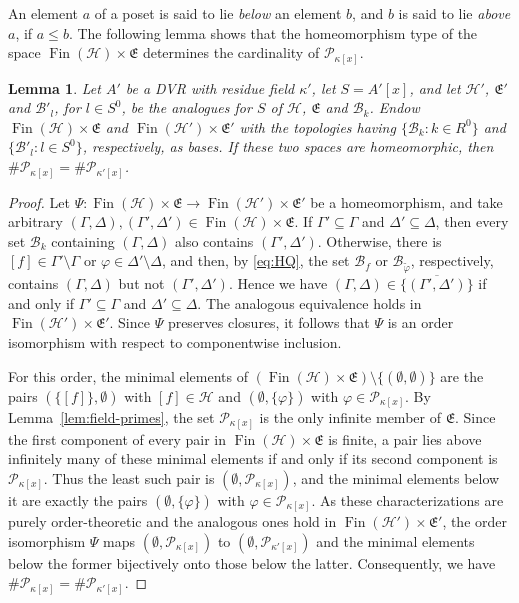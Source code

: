 \documentclass[12pt,reqno,a4paper]{amsart}
\newcommand{\Pe}{\mathcal{P}}
\DeclareMathOperator{\Fin}{Fin}
\theoremstyle{plain}
\newtheorem{lemma}[theorem]{Lemma}
\theoremstyle{definition}
\begin{document}
An element $a$ of a poset is said to lie \emph{below} an element $b$, and $b$ is said to lie \emph{above} $a$, if $a\leq b$. The following lemma shows that the homeomorphism type of the space $\Fin(\mathcal{H})\times\mathfrak{E}$ determines the cardinality of $\Pe_{\kappa[x]}$.
\begin{lemma}\label{lem:order-AX}
Let $A'$ be a DVR with residue field $\kappa'$, let $S=A'[x]$, and let $\mathcal{H}'$, $\mathfrak{E}'$ and $\mathcal{B}'_l$, for $l\in S^0$, be the analogues for $S$ of $\mathcal{H}$, $\mathfrak{E}$ and $\mathcal{B}_k$. Endow $\Fin(\mathcal{H})\times\mathfrak{E}$ and $\Fin(\mathcal{H}')\times\mathfrak{E}'$ with the topologies having $\{\mathcal{B}_k:k\in R^0\}$ and $\{\mathcal{B}'_l:l\in S^0\}$, respectively, as bases. If these two spaces are homeomorphic, then $\#\Pe_{\kappa[x]}=\#\Pe_{\kappa'[x]}$.
\end{lemma}
\begin{proof}
Let $\Psi\colon\Fin(\mathcal{H})\times\mathfrak{E}\to\Fin(\mathcal{H}')\times\mathfrak{E}'$ be a homeomorphism, and take arbitrary $(\Gamma,\Delta),(\Gamma',\Delta')\in\Fin(\mathcal{H})\times\mathfrak{E}$. If $\Gamma'\subseteq\Gamma$ and $\Delta'\subseteq\Delta$, then every set $\mathcal{B}_k$ containing $(\Gamma,\Delta)$ also contains $(\Gamma',\Delta')$. Otherwise, there is $[f]\in\Gamma'\setminus\Gamma$ or $\varphi\in\Delta'\setminus\Delta$, and then, by \eqref{eq:HQ}, the set $\mathcal{B}_f$ or $\mathcal{B}_{\tilde\varphi}$, respectively, contains $(\Gamma,\Delta)$ but not $(\Gamma',\Delta')$. Hence we have $(\Gamma,\Delta)\in\overline{\{(\Gamma',\Delta')\}}$ if and only if $\Gamma'\subseteq\Gamma$ and $\Delta'\subseteq\Delta$. The analogous equivalence holds in $\Fin(\mathcal{H}')\times\mathfrak{E}'$. Since $\Psi$ preserves closures, it follows that $\Psi$ is an order isomorphism with respect to componentwise inclusion.

For this order, the minimal elements of $(\Fin(\mathcal{H})\times\mathfrak{E})\setminus\{(\emptyset,\emptyset)\}$ are the pairs $(\{[f]\},\emptyset)$ with $[f]\in\mathcal{H}$ and $(\emptyset,\{\varphi\})$ with $\varphi\in\Pe_{\kappa[x]}$. By Lemma~\ref{lem:field-primes}, the set $\Pe_{\kappa[x]}$ is the only infinite member of $\mathfrak{E}$. Since the first component of every pair in $\Fin(\mathcal{H})\times\mathfrak{E}$ is finite, a pair lies above infinitely many of these minimal elements if and only if its second component is $\Pe_{\kappa[x]}$. Thus the least such pair is $(\emptyset,\Pe_{\kappa[x]})$, and the minimal elements below it are exactly the pairs $(\emptyset,\{\varphi\})$ with $\varphi\in\Pe_{\kappa[x]}$. As these characterizations are purely order-theoretic and the analogous ones hold in $\Fin(\mathcal{H}')\times\mathfrak{E}'$, the order isomorphism $\Psi$ maps $(\emptyset,\Pe_{\kappa[x]})$ to $(\emptyset,\Pe_{\kappa'[x]})$ and the minimal elements below the former bijectively onto those below the latter. Consequently, we have $\#\Pe_{\kappa[x]}=\#\Pe_{\kappa'[x]}$.
\end{proof}
\end{document}
